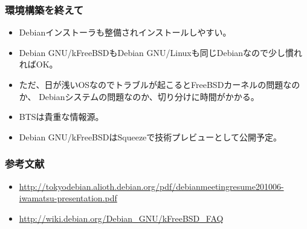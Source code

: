 \documentclass[cjk,dvipdfmx,12pt,%
hyperref={bookmarks=true,bookmarksnumbered=true,bookmarksopen=false,%
colorlinks=false,%
pdftitle={Debian GNU/kFreeBSDで暮らせる環境を構築してみる},%
pdfauthor={杉本典充},%
pdfsubject={第38回関西Debian勉強会},%
}]{beamer}
\begin{document}
\begin{frame}[fragile]
\frametitle{環境構築を終えて}
\begin{itemize}
  \item Debianインストーラも整備されインストールしやすい。
  \item Debian GNU/kFreeBSDもDebian GNU/Linuxも同じDebianなので少し慣れればOK。
  \item ただ、日が浅いOSなのでトラブルが起こるとFreeBSDカーネルの問題なのか、
Debianシステムの問題なのか、切り分けに時間がかかる。
  \item BTSは貴重な情報源。
  \item Debian GNU/kFreeBSDはSqueezeで技術プレビューとして公開予定。
\end{itemize}
\end{frame}


\begin{frame}[fragile]
\frametitle{参考文献}
\begin{itemize}
\item \url{http://tokyodebian.alioth.debian.org/pdf/debianmeetingresume201006-iwamatsu-presentation.pdf}
\item \url{http://wiki.debian.org/Debian_GNU/kFreeBSD_FAQ}
\end{itemize}
\end{frame}
\end{document}
